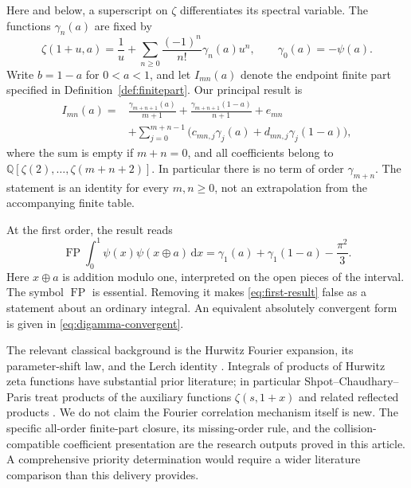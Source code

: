 \documentclass[11pt]{article}
\numberwithin{equation}{section}
\theoremstyle{definition}
\theoremstyle{remark}
\DeclareMathOperator{\FP}{FP}
\newcommand{\dd}{\,\mathrm d}
\newcommand{\Q}{\mathbb Q}
\begin{document}
Here and below, a superscript on $\zeta$ differentiates its spectral
variable. The functions $\gamma_n(a)$ are fixed by
\begin{equation}
 \zeta(1+u,a)=\frac1u+
 \sum_{n\geq0}\frac{(-1)^n}{n!}\gamma_n(a)u^n,
 \qquad \gamma_0(a)=-\psi(a).
 \label{eq:stieltjes-definition}
\end{equation}
Write $b=1-a$ for $0<a<1$, and let $I_{mn}(a)$ denote the endpoint finite
part specified in Definition~\ref{def:finitepart}. Our principal result is
\begin{equation}
\begin{split}
 I_{mn}(a)={}&\frac{\gamma_{m+n+1}(a)}{m+1}
       +\frac{\gamma_{m+n+1}(1-a)}{n+1}+e_{mn}\\
 &+\sum_{j=0}^{m+n-1}
       \bigl(c_{mn,j}\gamma_j(a)+d_{mn,j}\gamma_j(1-a)\bigr),
 \label{eq:front-result}
\end{split}
\end{equation}
where the sum is empty if $m+n=0$, and all coefficients belong to
$\Q[\zeta(2),\ldots,\zeta(m+n+2)]$. In particular there is no term of
order $\gamma_{m+n}$. The statement is an identity for every $m,n\geq0$,
not an extrapolation from the accompanying finite table.

At the first order, the result reads
\begin{equation}
 \FP\int_0^1\psi(x)\psi(x\mathbin\oplus a)\dd x
 =\gamma_1(a)+\gamma_1(1-a)-\frac{\pi^2}{3}.
 \label{eq:first-result}
\end{equation}
Here $x\mathbin\oplus a$ is addition modulo one, interpreted on the open
pieces of the interval. The symbol $\FP$ is essential. Removing it makes
\eqref{eq:first-result} false as a statement about an ordinary integral.
An equivalent absolutely convergent form is given in
\eqref{eq:digamma-convergent}.

The relevant classical background is the Hurwitz Fourier expansion,
its parameter-shift law, and the Lerch identity
\cite{dlmf-hurwitz,dlmf-polylog}. Integrals of products of Hurwitz zeta
functions have substantial prior literature; in particular
Shpot--Chaudhary--Paris treat products of the auxiliary functions
$\zeta(s,1+x)$ and related reflected products \cite{shpot}.
We do not claim the Fourier correlation mechanism itself is new.
The specific all-order finite-part closure, its missing-order rule,
and the collision-compatible coefficient presentation are the research
outputs proved in this article. A comprehensive priority determination
would require a wider literature comparison than this delivery provides.
\end{document}
